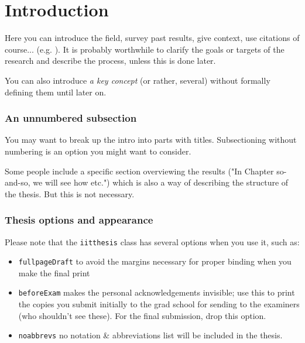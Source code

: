 

\chapter{Introduction}
\label{chap:intro}


Here you can introduce the field, survey past results, give context, use citations of course... (e.g. \cite{Papadimitriou1994}). It is probably worthwhile to clarify the goals or targets of the research and describe the process, unless this is done later.

You can also introduce \emph{a key concept} (or rather, several) without formally defining them until later on.

\subsection*{An unnumbered subsection}

You may want to break up the intro into parts with titles. Subsectioning without numbering is an option you might want to consider.

Some people include a specific section overviewing the results ("In Chapter so-and-so, we will see how etc.") which is also a way of describing the structure of the thesis. But this is not necessary.

\subsection*{Thesis options and appearance}

Please note that the \texttt{iitthesis} class has several options when you use it, such as:
\begin{itemize}
\item \texttt{fullpageDraft} to avoid the margins necessary for proper binding when you make the final print
\item \texttt{beforeExam} makes the personal acknowledgements invisible; use this to print the copies you submit initially to the grad school for sending to the examiners (who shouldn't see these). For the final submission, drop this option.
\item \texttt{noabbrevs} no notation \& abbreviations list will be included in the thesis.
\end{itemize}

